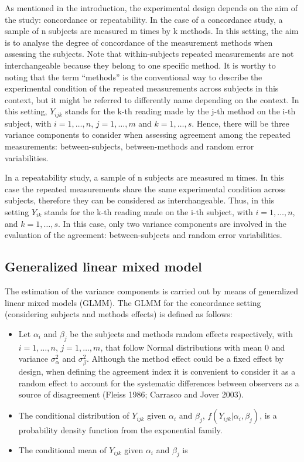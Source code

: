 As mentioned in the introduction, the experimental design depends on the aim of the study: concordance or repeatability. In the case of a concordance study, a sample of n subjects are measured m times by k methods. In this setting, the aim is to analyse the degree of concordance of the measurement methods when assessing the subjects. Note that within-subjects repeated measurements are not interchangeable because they belong to one specific method. It is worthy to noting that the term ``methods'' is the conventional way to describe the experimental condition of the repeated measurements across subjects in this context, but it might be referred to differently name depending on the context. In this setting, \(Y_{ijk}\) stands for the k-th reading made by the j-th method on the i-th subject, with \(i=1,\ldots,n\), \(j=1,\ldots,m\) and \(k=1,\ldots,s\). Hence, there will be three variance components to consider when assessing agreement among the repeated measurements: between-subjects, between-methods and random error variabilities.

In a repeatability study, a sample of n subjects are measured m times. In this case the repeated measurements share the same experimental condition across subjects, therefore they can be considered as interchangeable. Thus, in this setting \(Y_{ik}\) stands for the k-th reading made on the i-th subject, with \(i=1,\ldots,n\), and \(k=1,\ldots,s\). In this case, only two variance components are involved in the evaluation of the agreement: between-subjects and random error variabilities.

\hypertarget{generalized-linear-mixed-model}{%
\subsection{Generalized linear mixed model}\label{generalized-linear-mixed-model}}

The estimation of the variance components is carried out by means of generalized linear mixed models (GLMM). The GLMM for the concordance setting (considering subjects and methods effects) is defined as follows:

\begin{itemize}
\item
  Let \(\alpha_i\) and \(\beta_j\) be the subjects and methods random effects respectively, with \(i=1,\ldots,n\), \(j=1,\ldots,m\), that follow Normal distributions with mean 0 and variance \(\sigma_{\alpha}^2\) and \(\sigma_{\beta}^2\). Although the method effect could be a fixed effect by design, when defining the agreement index it is convenient to consider it as a random effect to account for the systematic differences between observers as a source of disagreement (Fleiss 1986; Carrasco and Jover 2003).
\item
  The conditional distribution of \(Y_{ijk}\) given \(\alpha_i\) and \(\beta_j\), \(f\left(Y_{ijk}|\alpha_i,\beta_j\right)\), is a probability density function from the exponential family.
\item
  The conditional mean of \(Y_{ijk}\) given \(\alpha_i\) and \(\beta_j\) is
\end{itemize}

